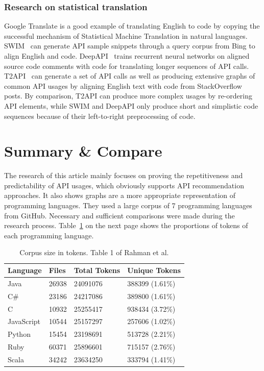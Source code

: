 \documentclass[runningheads]{llncs}
\begin{document}
\subsubsection{Research on statistical translation\\}
Google Translate is a good example of translating English to code by copying the successful mechanism of Statistical Machine Translation in natural languages. SWIM~\cite{ref_raghothaman2016} can generate API sample snippets through a query corpus from Bing to align English and code. DeepAPI~\cite{ref_gu2016} trains recurrent neural networks on aligned source code comments with code for translating longer sequences of API calls. T2API~\cite{ref_nguyen2013,ref_nguyen2016} can generate a set of API calls as well as producing extensive graphs of common API usages by aligning English text with code from StackOverflow posts. By comparison, T2API can produce more complex usages by re-ordering API elements, while SWIM and DeepAPI only produce short and simplistic code sequences because of their left-to-right preprocessing of code.

\section{Summary \& Compare}
The research of this article mainly focuses on proving the repetitiveness and predictability of API usages, which obviously supports API recommendation approaches. It also shows graphs are a more appropriate representation of programming languages. They used a large corpus of 7 programming languages from GitHub.  Necessary and sufficient comparisons were made during the research process. Table~\ref{tab1} on the next page shows the proportions of tokens of each programming language.

\begin{table}
\centering
\caption{Corpus size in tokens. Table 1 of Rahman et al.\cite{0_ref_proc1}}\label{tab1}
\begin{tabular}{l | l | l | l}
    \hline
    {\bfseries Language} &  {\bfseries Files} & {\bfseries Total Tokens} & {\bfseries Unique Tokens}\\
    \hline
    \hline
    Java &  26938 & 24091076 & 388399 (1.61\%) \\
    \hline
    C\# &  23186 & 24217086 & 389800 (1.61\%) \\
    \hline
    C &  10932 & 25255417 & 938434 (3.72\%) \\
    \hline
    JavaScript &  10544 & 25157297 & 257606 (1.02\%) \\
    \hline
    Python &  15454 & 23198691 & 513728 (2.21\%) \\
    \hline
    Ruby &  60371 & 25896601 & 715157 (2.76\%)\\
    \hline
    Scala &  34242 & 23634250 & 333794 (1.41\%)\\
    \hline
\end{tabular}
\end{table}
\end{document}
